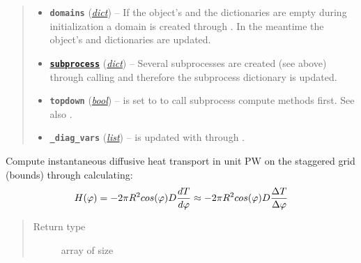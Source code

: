 \documentclass[letterpaper,10pt,english]{sphinxmanual}
\begin{document}
\begin{fulllineitems}
\begin{quote}
\begin{description}
\begin{itemize}
\item {} 
\textbf{\texttt{domains}} (\href{http://docs.python.org/2.7/library/stdtypes.html\#dict}{\emph{dict}}) -- If the object's  and the  
dictionaries are empty during initialization 
a domain  is created through 
{\hyperref[api/climlab.domain:climlab.domain.domain.zonal_mean_surface]{\emph{}}}.
In the meantime the object's  and 
 dictionaries are updated.

\item {} 
\href{http://docs.python.org/2.7/library/subprocess.html\#module-subprocess}{\textbf{\texttt{subprocess}}} (\href{http://docs.python.org/2.7/library/stdtypes.html\#dict}{\emph{dict}}) -- Several subprocesses are created (see above) 
through calling 
{\hyperref[api/climlab.process:climlab.process.process.Process.add_subprocess]{\emph{}}}
and therefore the subprocess dictionary is updated.

\item {} 
\textbf{\texttt{topdown}} (\href{http://docs.python.org/2.7/library/functions.html\#bool}{\emph{bool}}) -- is set to  to call subprocess compute 
methods first.
See also 
{\hyperref[api/climlab.process:climlab.process.time_dependent_process.TimeDependentProcess]{\emph{}}}.

\item {} 
\textbf{\texttt{\_diag\_vars}} (\href{http://docs.python.org/2.7/library/functions.html\#list}{\emph{list}}) -- is updated with 
through {\hyperref[api/climlab.process:climlab.process.process.Process.add_diagnostics]{\emph{}}}.

\end{itemize}

\end{description}\end{quote}

\begin{fulllineitems}
\label{api/climlab.model:climlab.model.ebm.EBM.diffusive_heat_transport}
Compute instantaneous diffusive heat transport in unit \(\textrm{PW}\)
on the staggered grid (bounds) through calculating:
\begin{gather}
\begin{split}H(\varphi) = - 2 \pi R^2 cos(\varphi) D \frac{dT}{d\varphi}
            \approx - 2 \pi R^2 cos(\varphi) D \frac{\Delta T}{\Delta \varphi}\end{split}\notag
\end{gather}\begin{quote}\begin{description}
\item[{Return type}] \leavevmode
array of size 


\end{description}
\end{quote}
\end{fulllineitems}
\end{fulllineitems}
\end{document}

